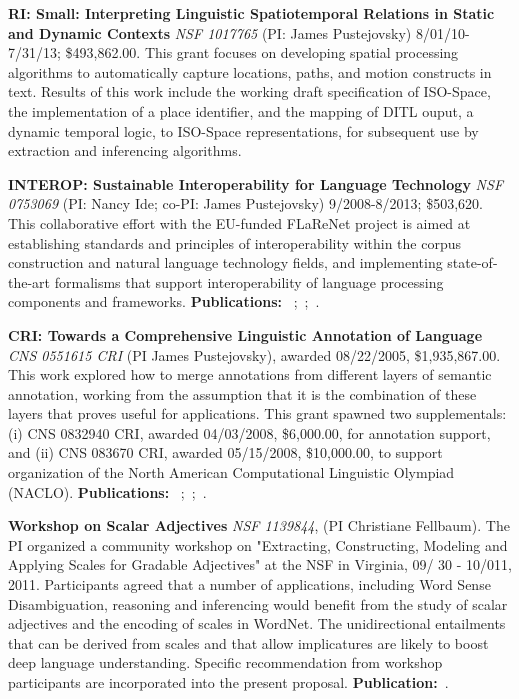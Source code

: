 \documentclass[10pt]{article}
\newcommand{\miniskip}{\vspace*{1mm}}
\begin{document}
\miniskip\noindent
 {\bf 
RI: Small: Interpreting Linguistic Spatiotemporal Relations in Static and Dynamic Contexts}
{\it NSF 1017765} (PI: James Pustejovsky)  8/01/10-7/31/13; 
\$493,862.00. This grant focuses on developing spatial processing algorithms  to automatically capture locations, paths, and motion constructs in text.  Results of this work include the working draft specification of ISO-Space, the implementation of a place identifier, and the mapping of DITL ouput, a dynamic temporal logic, to ISO-Space representations, for subsequent use by extraction and inferencing algorithms. 

\miniskip\noindent
{\bf INTEROP: Sustainable Interoperability for Language Technology} 
{\it NSF 0753069} (PI: Nancy Ide; co-PI: James Pustejovsky) 9/2008-8/2013; \$503,620.
This collaborative effort with the EU-funded FLaReNet project is aimed at establishing standards and principles of interoperability within the corpus construction and natural language technology fields, and implementing state-of-the-art formalisms that support interoperability of language processing components and frameworks.  {\bf Publications: }~\cite{idesuderman09};~\cite{ide-bunt:2010:LAW-IV};~\cite{cieri-etal}.

\miniskip\noindent
{\bf CRI: Towards a Comprehensive Linguistic Annotation of Language} {\it CNS 0551615 CRI} (PI James Pustejovsky), awarded 08/22/2005, \$1,935,867.00. This work explored how to merge annotations from different layers of semantic annotation, working from the assumption that it is the combination of these layers that proves useful for applications. This grant spawned two supplementals: (i) CNS 0832940 CRI, awarded 04/03/2008, \$6,000.00, for annotation support, and (ii) CNS 083670 CRI, awarded 05/15/2008, \$10,000.00, to support organization of the North American Computational Linguistic Olympiad (NACLO). {\bf Publications: }~\cite{verhagen-stubbs-pustejovsky:2007:LAW};~\cite{verhagen-EtAl:2007:SemEval-2007};~\cite{verhagen-pustejovsky:2007:Interoperability}.

\miniskip\noindent
{\bf Workshop on Scalar Adjectives}
{\it  NSF   1139844}, (PI Christiane Fellbaum).  The PI organized a community workshop on "Extracting, Constructing, 
Modeling and Applying Scales for Gradable Adjectives" at the NSF in Virginia, 09/ 30 - 10/011, 2011. Participants agreed that a number of applications, including  
Word Sense Disambiguation,  reasoning and inferencing would benefit 
from the study of scalar adjectives and the encoding of scales in WordNet. The
unidirectional entailments that can be derived from scales and that allow implicatures are
likely to boost deep language understanding. Specific recommendation from workshop participants 
are incorporated into the present proposal. {\bf Publication:}~\cite{sheinmanetal2013}.
\end{document}
